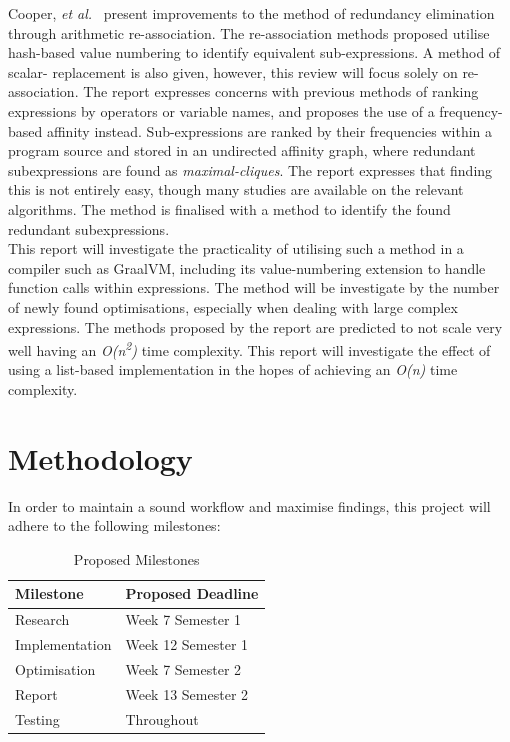 \documentclass[12pt,openany,a4paper]{book}
\begin{document}
Cooper, \emph{et al.}~\cite{redund} present improvements to the method of redundancy elimination through
arithmetic re-association. The re-association methods proposed utilise hash-based
value numbering to identify equivalent sub-expressions. A method of scalar-
replacement is also given, however, this review will focus solely on re-association.
The report expresses concerns with previous methods of ranking expressions 
by operators or variable names, and proposes the use of a frequency-based affinity
instead. Sub-expressions are ranked by their frequencies within a program source and
stored in an undirected affinity graph, where redundant subexpressions are found
as \emph{maximal-cliques}. The report expresses that finding this is not
entirely easy, though many studies are available on the relevant algorithms.
The method is finalised with a method to identify the found redundant subexpressions.\\
This report will investigate the practicality of utilising such a method in a
compiler such as GraalVM, including its value-numbering extension to handle
function calls within expressions. The method will be investigate by
the number of newly found optimisations, especially when dealing with large
complex expressions. The methods proposed by the report are predicted to
not scale very well having an \emph{O(n\textsuperscript{2})} time complexity.
This report will investigate the effect of using a list-based implementation in
the hopes of achieving an \emph{O(n)} time complexity.

\chapter{Methodology}
\label{methods}

In order to maintain a sound workflow and maximise findings, this project will
adhere to the following milestones:

\begin{table}[ht]
    \centering
    \begin{tabular}{ |p{8cm}|p{4cm}| }
        \hline
        \textbf{Milestone} & \textbf{Proposed Deadline}\\
        \hline
        Research & Week 7 Semester 1\\
        \hline
        Implementation & Week 12 Semester 1\\
        \hline
        Optimisation & Week 7 Semester 2\\
        \hline
        Report & Week 13 Semester 2\\
        \hline
        Testing & Throughout\\
        \hline
    \end{tabular}
    \caption{Proposed Milestones}
    \label{milestones}
\end{table}
\end{document}
